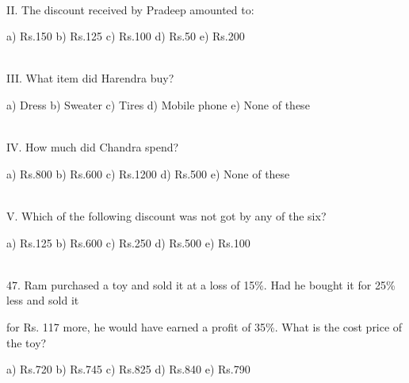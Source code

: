 \documentclass{article} %
\begin{document}
\noindent 

\noindent 

\noindent  \\ II.         The discount received by Pradeep amounted to:

\noindent 

\noindent a) Rs.150          b) Rs.125          c) Rs.100           d) Rs.50            e) Rs.200

\noindent 

\noindent 

\noindent 

\noindent \\  III.        What item did Harendra buy?

\noindent 

	a) Dress  b) Sweater  c) Tires 
	d) Mobile phone e) None of these    




\noindent 

\noindent 

\noindent \\  IV.       How much did Chandra spend?

\noindent 

\noindent a) Rs.800          b) Rs.600          c) Rs.1200         d) Rs.500      e) None of these







\noindent \\  V.         Which of the following discount was not got by any of the six?

\noindent 

\noindent a) Rs.125          b) Rs.600          c) Rs.250           d) Rs.500          e) Rs.100

\noindent 

\noindent 

\noindent 

\noindent \\  47. Ram purchased a toy and sold it at a loss of 15\%. Had he bought it for 25\% less and sold it

\noindent 

\noindent for Rs. 117 more, he would have earned a profit of 35\%. What is the cost price of the toy?

\noindent 

\noindent a) Rs.720                b) Rs.745          c) Rs.825          d) Rs.840          e) Rs.790

\noindent 
\end{document}

